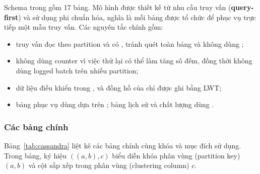 Schema trong  gồm 17 bảng. Mô hình được thiết kế từ nhu cầu truy vấn (\textbf{query-first}) và sử dụng phi chuẩn hóa, nghĩa là mỗi bảng được tổ chức để phục vụ trực tiếp một mẫu truy vấn. Các nguyên tắc chính gồm:
\begin{itemize}
    \item truy vấn đọc theo partition và có , tránh quét toàn bảng và không dùng ;
    \item không dùng counter vì việc thử lại có thể làm tăng số đếm, đồng thời không dùng logged batch trên nhiều partition;
    \item dữ liệu điều khiển trong ,  và đồng hồ của  chỉ được ghi bằng LWT;
    \item bảng phục vụ dùng  dựa trên ; bảng lịch sử và chất lượng dùng .
\end{itemize}

\subsubsection{Các bảng chính}

Bảng~\ref{tab:cassandra} liệt kê các bảng chính cùng khóa và mục đích sử dụng. Trong bảng, ký hiệu $((a,b),c)$ biểu diễn khóa phân vùng (partition key) $(a,b)$ và cột sắp xếp trong phân vùng (clustering column) $c$.

